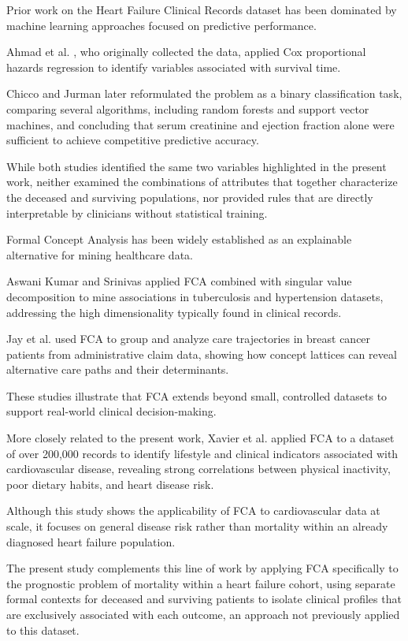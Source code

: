\documentclass[a4paper,twoside]{article}
\begin{document}
Prior work on the Heart Failure Clinical Records dataset has been dominated by machine learning approaches focused on predictive performance.

Ahmad et al. \cite{Ahmad2017}, who originally collected the data, applied Cox proportional hazards regression to identify variables associated with survival time.

Chicco and Jurman \cite{ChiccoJurman2020} later reformulated the problem as a binary classification task, comparing several algorithms, including random forests and support vector machines, and concluding that serum creatinine and ejection fraction alone were sufficient to achieve competitive predictive accuracy.

While both studies identified the same two variables highlighted in the present work, neither examined the combinations of attributes that together characterize the deceased and surviving populations, nor provided rules that are directly interpretable by clinicians without statistical training.

Formal Concept Analysis has been widely established as an explainable alternative for mining healthcare data.

Aswani Kumar and Srinivas \cite{AswaniKumar2010} applied FCA combined with singular value decomposition to mine associations in tuberculosis and hypertension datasets, addressing the high dimensionality typically found in clinical records.

Jay et al. \cite{Jay2013} used FCA to group and analyze care trajectories in breast cancer patients from administrative claim data, showing how concept lattices can reveal alternative care paths and their determinants.

These studies illustrate that FCA extends beyond small, controlled datasets to support real-world clinical decision-making.

More closely related to the present work, Xavier et al. \cite{Xavier2025} applied FCA to a dataset of over 200,000 records to identify lifestyle and clinical indicators associated with cardiovascular disease, revealing strong correlations between physical inactivity, poor dietary habits, and heart disease risk.

Although this study shows the applicability of FCA to cardiovascular data at scale, it focuses on general disease risk rather than mortality within an already diagnosed heart failure population.

The present study complements this line of work by applying FCA specifically to the prognostic problem of mortality within a heart failure cohort, using separate formal contexts for deceased and surviving patients to isolate clinical profiles that are exclusively associated with each outcome, an approach not previously applied to this dataset.
\end{document}
